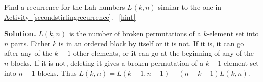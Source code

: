 \documentclass{book}
\begin{document}
\setcounter{project}{201}
\addtocounter{project}{-1}
\begin{activity}[]\label{activity-194}
\hypertarget{p-1143}{}%
Find a recurrence for the Lah numbers \(L(k,n)\) similar to the one in \hyperref[secondstirlingrecurrence]{Activity~\ref{secondstirlingrecurrence}}.%
~\hfill{\tiny\hyperlink{a-201}{[hint]}\hypertarget{q-201}{}}\par\smallskip%
\noindent\textbf{Solution.}\hypertarget{solution-116}{}\quad%
\hypertarget{p-1145}{}%
\(L(k,n)\) is the number of broken permutations of a \(k\)-element set into \(n\) parts. Either \(k\) is in an ordered block by itself or it is not. If it is, it can go after any of the \(k-1\) other elements, or it can go at the beginning of any of the \(n\) blocks. If it is not, deleting it gives a broken permutation of a \(k-1\)-element set into \(n-1\) blocks. Thus \(L(k,n)=L(k-1,n-1) + (n+k-1)L(k,n)\).%
\end{activity}
\end{document}
